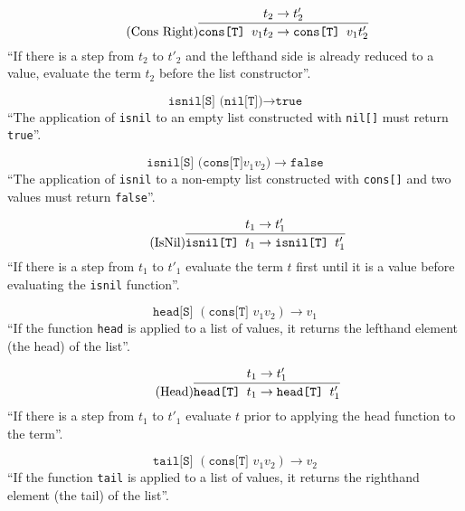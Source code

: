 \begin{equation*}
    \tag{Cons Right}
    \infer{
        \texttt{cons[T] } v_1 t_2 \rightarrow \texttt{cons[T] } v_1 t'_2
    }{
        t_2 \rightarrow t'_2
    }
\end{equation*}
``If there is a step from $t_2$ to $t'_2$ and the lefthand side
is already reduced to a value, evaluate the term $t_2$
before the list constructor''.

\begin{equation*}
    \tag{IsNil of Nil}
    \texttt{isnil[S] (nil[T])} \rightarrow \texttt{true}
\end{equation*}
``The application of \texttt{isnil} to an empty list constructed
with \texttt{nil[]} must return \texttt{true}''.

\begin{equation*}
    \tag{IsNil of Nil}
    \texttt{isnil[S] (cons[T]} v_1 v_2 \texttt{)} \rightarrow \texttt{false}
\end{equation*}
``The application of \texttt{isnil} to a non-empty list constructed
with \texttt{cons[]} and two values must return \texttt{false}''.

\begin{equation*}
    \tag{IsNil}
    \infer{
        \texttt{isnil[T] } t_1 \rightarrow \texttt{isnil[T] } t'_1
    }{
        t_1 \rightarrow t'_1
    }
\end{equation*}
``If there is a step from $t_1$ to $t'_1$ evaluate the term $t$ first
until it is a value before evaluating the \texttt{isnil} function''.

\begin{equation*}
    \tag{Head of cons}
    \texttt{head[S] } (\texttt{cons[T] } v_1 v_2) \rightarrow v_1
\end{equation*}
``If the function \texttt{head} is applied to a list of values,
it returns the lefthand element (the head) of the list''.

\begin{equation*}
    \tag{Head}
    \infer{
        \texttt{head[T] } t_1 \rightarrow \texttt{head[T] } t'_1
    }{
        t_1 \rightarrow t'_1
    }
\end{equation*}
``If there is a step from $t_1$ to $t'_1$ evaluate $t$ prior to applying
the head function to the term''.

\begin{equation*}
    \tag{Tail of cons}
    \texttt{tail[S] } (\texttt{cons[T] } v_1 v_2) \rightarrow v_2
\end{equation*}
``If the function \texttt{tail} is applied to a list of values,
it returns the righthand element (the tail) of the list''.

